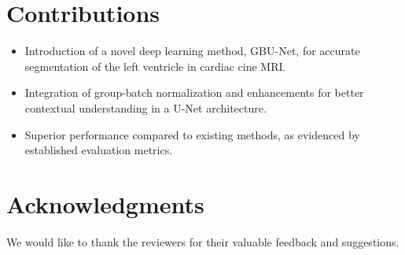 \documentclass[11pt]{article}
\begin{document}
\section{Contributions}
\begin{itemize}
    \item Introduction of a novel deep learning method, GBU-Net, for accurate segmentation of the left ventricle in cardiac cine MRI.
    \item Integration of group-batch normalization and enhancements for better contextual understanding in a U-Net architecture.
    \item Superior performance compared to existing methods, as evidenced by established evaluation metrics.
\end{itemize}

\section*{Acknowledgments}
We would like to thank the reviewers for their valuable feedback and suggestions.



\end{document}
